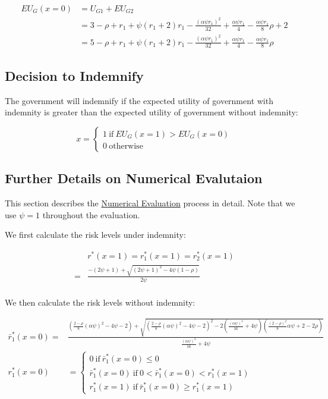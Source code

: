 \documentclass[
  a4paper,
  abstract=true]{scrartcl}
\theoremstyle{definition}
\begin{document}
\begin{align*}
EU_G(x=0)&=U_{G1}+EU_{G2}\\
&=3-\rho+r_1+\psi(r_1+2)r_1-\frac{(\alpha\psi r_1)^2}{32}+\frac{\alpha\psi r_1}{4}-\frac{\alpha\psi r_1}{8}\rho+2 \\
&=5-\rho+r_1+\psi(r_1+2)r_1-\frac{(\alpha\psi r_1)^2}{32}+\frac{\alpha\psi r_1}{4}-\frac{\alpha\psi r_1}{8}\rho
\end{align*}

\subsection{Decision to Indemnify}\label{decision-to-indemnify}

The government will indemnify if the expected utility of government with
indemnity is greater than the expected utility of government without
indemnity:

\[
x=\begin{cases}
1~\text{if}~ EU_G(x=1)>EU_G(x=0)\\
0~\text{otherwise}
\end{cases}
\]

\subsection{Further Details on Numerical
Evalutaion}\label{further-details-on-numerical-evalutaion}

This section describes the \hyperref[sec-simulation]{Numerical
Evaluation} process in detail. Note that we use \(\psi=1\) throughout
the evaluation.

We first calculate the risk levels under indemnity:

\begin{align*}
&r^*(x=1)=r^*_1(x=1)=r^*_2(x=1) \\
=&\frac{-(2\psi+1)+\sqrt{(2\psi+1)^2-4\psi(1-\rho)}}{2\psi} \\
\end{align*}

We then calculate the risk levels without indemnity:

\begin{align*}
\bar r_1^*(x=0)=&\frac{(\frac{2-\rho}{8}(\alpha\psi)^2-4\psi-2)+\sqrt{(\frac{2-\rho}{8}(\alpha\psi)^2-4\psi-2)^2-2(\frac{(\alpha\psi)^3}{16}+4\psi)(\frac{(2-\rho)^2}{8}\alpha\psi+2-2\rho)}}{\frac{(\alpha\psi)^3}{16}+4\psi} \\
r_1^*(x=0)&=\begin{cases}
0~\text{if}~\bar r_1^*(x=0)\leq0\\
\bar r_1^*(x=0)~\text{if}~0<\bar r_1^*(x=0)<r_1^*(x=1) \\
r_1^*(x=1)~\text{if}~\bar r_1^*(x=0)\geq r_1^*(x=1)
\end{cases}
\end{align*}
\end{document}
